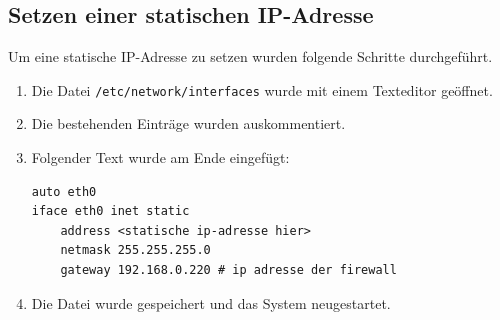 \documentclass[
    a4paper,
    pagesize,
	pdftex,
    12pt,
]{scrartcl}
\begin{document}
\subsection{Setzen einer statischen IP-Adresse}\label{static-ip}
Um eine statische IP-Adresse zu setzen wurden folgende Schritte durchgeführt.
\begin{enumerate}
	\item Die Datei \lstinline[breaklines]|/etc/network/interfaces| wurde mit einem Texteditor geöffnet.
	\item Die bestehenden Einträge wurden auskommentiert.
	\item Folgender Text wurde am Ende eingefügt:
	\begin{lstlisting}[breaklines]
auto eth0
iface eth0 inet static
	address <statische ip-adresse hier>
	netmask 255.255.255.0
	gateway 192.168.0.220 # ip adresse der firewall
	\end{lstlisting}
	\item Die Datei wurde gespeichert und das System neugestartet.
\end{enumerate}

\newpage


\end{document}

